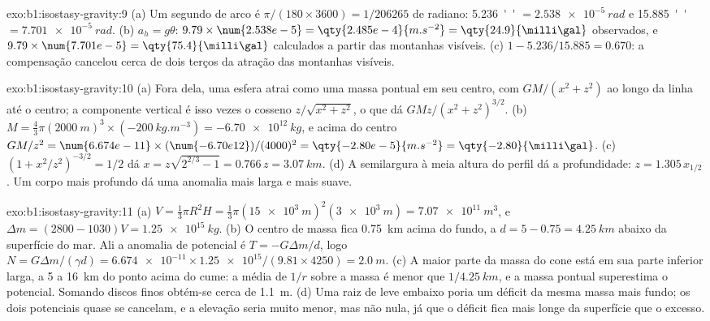 \begin{solution}{exo:b1:isostasy-gravity:9}
(a) Um segundo de arco é $\pi/(180\times3600) = 1/\num{206265}$ de radiano:
\qty{5.236}{''} $= \qty{2.538e-5}{rad}$ e \qty{15.885}{''} $=
\qty{7.701e-5}{rad}$. (b) $a_h = g\theta$: $9.79\times\num{2.538e-5} =
\qty{2.485e-4}{m.s^{-2}} = \qty{24.9}{\milli\gal}$ observados, e
$9.79\times\num{7.701e-5} = \qty{75.4}{\milli\gal}$ calculados a partir das
montanhas visíveis. (c) $1 - 5.236/15.885 = 0.670$: a compensação cancelou cerca de dois
terços da atração das montanhas visíveis.
\end{solution}

\begin{solution}{exo:b1:isostasy-gravity:10}
(a) Fora dela, uma esfera atrai como uma massa pontual em seu centro, com
$GM/(x^2 + z^2)$ ao longo da linha até o centro; a componente vertical é isso
vezes o cosseno $z/\sqrt{x^2 + z^2}$, o que dá $GMz/(x^2 + z^2)^{3/2}$.
(b) $M = \tfrac43\pi(\qty{2000}{m})^3\times(\qty{-200}{kg.m^{-3}}) =
\qty{-6.70e12}{kg}$, e acima do centro $GM/z^2 = \num{6.674e-11}\times
(\num{-6.70e12})/(4000)^2 = \qty{-2.80e-5}{m.s^{-2}} = \qty{-2.80}{\milli\gal}$.
(c) $(1 + x^2/z^2)^{-3/2} = 1/2$ dá $x = z\sqrt{2^{2/3} - 1} = 0.766\,z =
\qty{3.07}{km}$. (d) A semilargura à meia altura do perfil dá a
profundidade: $z = 1.305\,x_{1/2}$. Um corpo mais profundo dá uma anomalia mais larga e mais suave.
\end{solution}

\begin{solution}{exo:b1:isostasy-gravity:11}
(a) $V = \tfrac13\pi R^2 H = \tfrac13\pi(\qty{15e3}{m})^2(\qty{3e3}{m}) =
\qty{7.07e11}{m^3}$, e $\Delta m = (2800 - 1030)V = \qty{1.25e15}{kg}$.
(b) O centro de massa fica \qty{0.75}{km} acima do fundo, a
$d = 5 - 0.75 = \qty{4.25}{km}$ abaixo da superfície do mar. Ali a anomalia de potencial
é $T = -G\Delta m/d$, logo $N = G\Delta m/(\gamma d) =
\num{6.674e-11}\times\num{1.25e15}/(9.81\times4250) = \qty{2.0}{m}$.
(c) A maior parte da massa do cone está em sua parte inferior larga, a 5 a
\qty{16}{km} do ponto acima do cume: a média de $1/r$ sobre a massa é menor que $1/\qty{4.25}{km}$, e a massa pontual superestima o
potencial. Somando discos finos obtém-se cerca de \qty{1.1}{m}.
(d) Uma raiz de  leve embaixo poria um déficit da mesma massa mais fundo;
os dois potenciais quase se cancelam, e a elevação seria muito menor,
mas não nula, já que o déficit fica mais longe da superfície que o excesso.
\end{solution}

